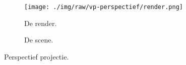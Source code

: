 \begin{figure}
  \centering
  \begin{subfigure}[b]{0.5\textwidth}
    \centering
    \texttt{[image: ./img/raw/vp-perspectief/render.png]}
    \caption{De render.}
    \label{fig:vp-perspectief:render}
  \end{subfigure}%
  \begin{subfigure}[b]{0.5\textwidth}
    \centering
    \caption{De scene.}
    \label{fig:vp-perspectief:scene}
  \end{subfigure}
  \caption{Perspectief projectie.}
  \label{fig:vp-perspectief}
\end{figure}
